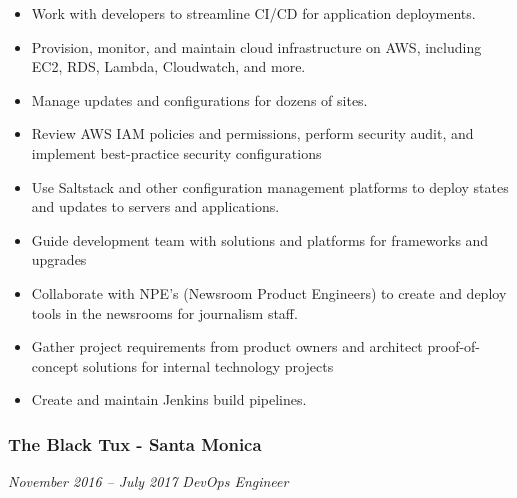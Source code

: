 \documentclass[]{article}
\providecommand{\tightlist}{%
  \setlength{\itemsep}{0pt}\setlength{\parskip}{0pt}}
\begin{document}
\begin{itemize}
\tightlist
\item
  Work with developers to streamline CI/CD for application deployments.
\item
  Provision, monitor, and maintain cloud infrastructure on AWS,
  including EC2, RDS, Lambda, Cloudwatch, and more.
\item
  Manage updates and configurations for dozens of sites.
\item
  Review AWS IAM policies and permissions, perform security audit, and
  implement best-practice security configurations
\item
  Use Saltstack and other configuration management platforms to deploy
  states and updates to servers and applications.
\item
  Guide development team with solutions and platforms for frameworks and
  upgrades
\item
  Collaborate with NPE's (Newsroom Product Engineers) to create and
  deploy tools in the newsrooms for journalism staff.
\item
  Gather project requirements from product owners and architect
  proof-of-concept solutions for internal technology projects
\item
  Create and maintain Jenkins build pipelines.
\end{itemize}

\hypertarget{the-black-tux---santa-monica}{%
\subsubsection{The Black Tux - Santa
Monica}\label{the-black-tux---santa-monica}}

\emph{November 2016 -- July 2017} \emph{DevOps Engineer}
\end{document}
